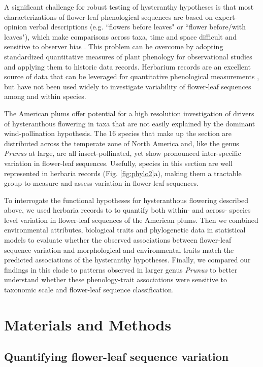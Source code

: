 \documentclass{article}[12pt]
\begin{document}
\noindent A significant challenge for robust testing of hysteranthy hypotheses is that most characterizations of flower-leaf phenological sequences are based on expert-opinion verbal descriptions (e.g. ``flowers before leaves" or ``flower before/with leaves"), which make comparisons across taxa, time and space difficult and sensitive to observer bias  \citep[see;][]{Buonaiuto2020}. This problem can be overcome by adopting standardized quantitative measures of plant phenology for observational studies and applying them to historic data records. Herbarium records are an excellent source of data that can be leveraged for quantitative phenological measurements \citep{Willis2017}, but have not been used widely to investigate variability of flower-leaf sequences among and within species.

\noindent The American plums offer potential for a high resolution investigation of drivers of hysteranthous flowering in taxa that are not easily explained by the dominant wind-pollination hypothesis. The 16 species that make up the section are distributed across the temperate zone of North America and, like the genus \textit{Prunus} at large, are all insect-pollinated, yet show pronounced inter-specific variation in flower-leaf sequences. Usefully, species in this section are well represented in herbaria records (Fig. \ref{fig:phylo2}a), making them a tractable group to measure and assess variation in flower-leaf sequences.

\noindent To interrogate the functional hypotheses for hysteranthous flowering described above, we used herbaria records to to quantify both within- and across- species level variation in flower-leaf sequences of the American plums. Then we combined environmental attributes, biological traits and phylogenetic data in statistical models to evaluate whether the observed associations between flower-leaf sequence variation and morphological and environmental traits match the predicted associations of the hysteranthy hypotheses. Finally, we compared our findings in this clade to patterns observed in larger genus \emph{Prunus} to better understand whether these phenology-trait associations were sensitive to taxonomic scale and flower-leaf sequence classification.


\section*{Materials and Methods}
\subsection*{Quantifying flower-leaf sequence variation}  
\end{document}
